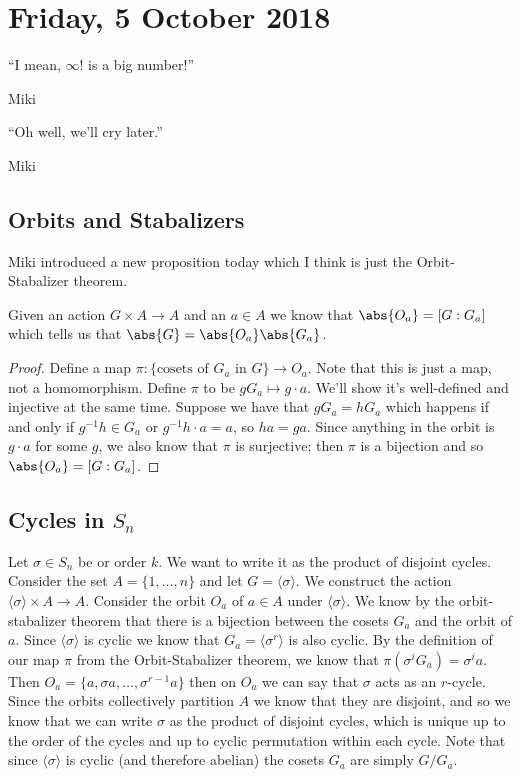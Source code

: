 \section{Friday, 5 October 2018}

\epigraph{``I mean, $\infty!$ is a big number!''}{Miki}
\epigraph{``Oh well, we'll cry later.''}{Miki}

\subsection{Orbits and Stabalizers}

Miki introduced a new proposition today which I think is just the Orbit-Stabalizer theorem.

\begin{proposition}
Given an action $G \times A \to A$ and an $a \in A$ we know that $\abs{O_a} = [G : G_a]$ which tells us that $\abs{G} = \abs{O_a}\abs{G_a}$.
\end{proposition}

\begin{proof}
Define a map $\pi : \{\text{cosets of $G_a$ in $G$}\} \to O_a$.  Note that this is just a map, not a homomorphism. Define $\pi$ to be $gG_a \mapsto g \cdot a$. We'll show it's well-defined and injective at the same time. Suppose we have that $gG_a = hG_a$ which happens if and only if $g^{-1}h \in G_a$ or $g^{-1}h \cdot a = a$, so $ha = ga$. Since anything in the orbit is $g \cdot a$ for some $g$, we also know that $\pi$ is surjective; then $\pi$ is a bijection and so $\abs{O_a} = [G : G_a]$.
\end{proof}

\subsection{Cycles in \texorpdfstring{$S_n$}{Sn}}

Let $\sigma \in S_n$ be or order $k$. We want to write it as the product of disjoint cycles.
Consider the set $A = \{1,\dotsc,n\}$ and let $G = \langle \sigma \rangle$. We construct the action $\langle \sigma \rangle \times A \to A$. Consider the orbit $O_a$ of $a \in A$ under $\langle \sigma \rangle$. We know by the orbit-stabalizer theorem that there is a bijection between the cosets $G_a$ and the orbit of $a$. Since $\langle \sigma \rangle$ is cyclic we know that $G_a = \langle \sigma^r \rangle$ is also cyclic. By the definition of our map $\pi$ from the Orbit-Stabalizer theorem, we know that $\pi(\sigma^iG_a) = \sigma^i a$. Then $O_a = \{a, \sigma a, \dotsc, \sigma^{r-1}a\}$ then on $O_a$ we can say that $\sigma$ acts as an $r$-cycle. Since the orbits collectively partition $A$ we know that they are disjoint, and so we know that we can write $\sigma$ as the product of disjoint cycles, which is unique up to the order of the cycles and up to cyclic permutation within each cycle.
Note that since $\langle \sigma \rangle$ is cyclic (and therefore abelian) the cosets $G_a$ are simply $G/G_a$.

